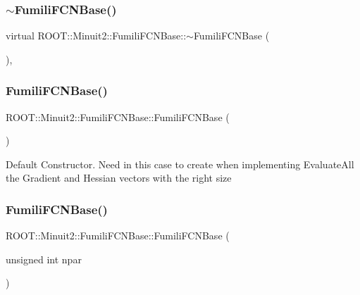 \subsubsection{\texorpdfstring{$\sim$FumiliFCNBase()}{~FumiliFCNBase()}\hspace{0.1cm}{\footnotesize\ttfamily [2/3]}}
{\footnotesize\ttfamily virtual R\+O\+O\+T\+::\+Minuit2\+::\+Fumili\+F\+C\+N\+Base\+::$\sim$\+Fumili\+F\+C\+N\+Base (\begin{DoxyParamCaption}{ }\end{DoxyParamCaption})\hspace{0.3cm}{\ttfamily [inline]}, {\ttfamily [virtual]}}

\mbox{\label{classROOT_1_1Minuit2_1_1FumiliFCNBase_a118a4f34ec003713b719671842f5c6a2}} 
\subsubsection{\texorpdfstring{FumiliFCNBase()}{FumiliFCNBase()}\hspace{0.1cm}{\footnotesize\ttfamily [5/6]}}
{\footnotesize\ttfamily R\+O\+O\+T\+::\+Minuit2\+::\+Fumili\+F\+C\+N\+Base\+::\+Fumili\+F\+C\+N\+Base (\begin{DoxyParamCaption}{ }\end{DoxyParamCaption})\hspace{0.3cm}{\ttfamily [inline]}}

Default Constructor. Need in this case to create when implementing Evaluate\+All the Gradient and Hessian vectors with the right size \mbox{\label{classROOT_1_1Minuit2_1_1FumiliFCNBase_ad20bc861c81429cd75a0b14d5449f066}} 
\subsubsection{\texorpdfstring{FumiliFCNBase()}{FumiliFCNBase()}\hspace{0.1cm}{\footnotesize\ttfamily [6/6]}}
{\footnotesize\ttfamily R\+O\+O\+T\+::\+Minuit2\+::\+Fumili\+F\+C\+N\+Base\+::\+Fumili\+F\+C\+N\+Base (\begin{DoxyParamCaption}\item[{unsigned int}]{npar }\end{DoxyParamCaption})\hspace{0.3cm}{\ttfamily [inline]}}

